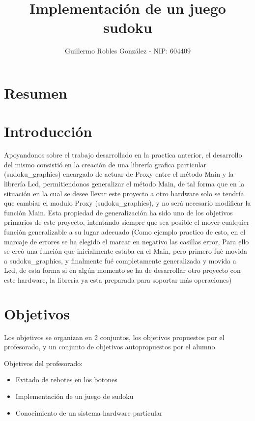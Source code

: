 \documentclass[12pt,letterpaper]{article}
\title{Implementación de un juego sudoku} %
\author{Guillermo Robles González - NIP: 604409}
\begin{document}
\maketitle
\tableofcontents
\clearpage
\section{Resumen}



\section{Introducción}
Apoyandonos sobre el trabajo desarrollado en la practica anterior, el
desarrollo del mismo consistió en la creación de una librería grafica
particular (sudoku\_graphics) encargado de actuar de Proxy entre el
método Main y la librería Lcd, permitiendonos generalizar el método
Main, de tal forma que en la situación en la cual se desee llevar este
proyecto a otro hardware solo se tendría que cambiar el modulo Proxy
(sudoku\_graphics), y no será necesario modificar la función Main.
Esta propiedad de generalización ha sido uno de los objetivos
primarios de este proyecto, intentando siempre que sea posible el
mover cualquier función generalizable a su lugar adecuado (Como
ejemplo practico de esto, en el marcaje de errores se ha elegido el
marcar en negativo las casillas error, Para ello se creó una función
que inicialmente estaba en el Main, pero primero fué movida a
sudoku\_graphics, y finalmente fué completamente generalizada y movida
a Lcd, de esta forma si en algún momento se ha de desarrollar otro
proyecto con este hardware, la librería ya esta preparada para
soportar más operaciones)

\section{Objetivos}
Los objetivos se organizan en 2 conjuntos, los objetivos propuestos
por el profesorado, y un conjunto de objetivos autopropuestos por el
alumno.

Objetivos del profesorado:
\begin{itemize}
  \item Evitado de rebotes en los botones
  \item Implementación de un juego de sudoku
  \item Conocimiento de un sistema hardware particular
\end{itemize}
\end{document}
